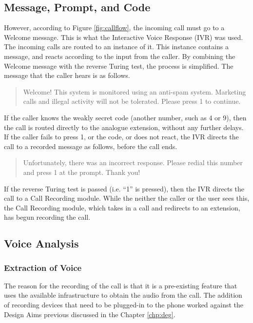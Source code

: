 \documentclass[main.tex]{subfiles}
\begin{document}
\subsection{Message, Prompt, and Code}
However, according to Figure \ref{fig:callflow}, the incoming call must go to a Welcome message. This is what the Interactive Voice Response (IVR) was used. The incoming calls are routed to an instance of it. This instance contains a message, and reacts according to the input from the caller. By combining the Welcome message with the reverse Turing test, the process is simplified. The message that the caller hears is as follows.

\begin{quote}
	Welcome! This system is monitored using an anti-spam system. Marketing calls and illegal activity will not be tolerated. Please press 1 to continue.
\end{quote}

If the caller knows the weakly secret code (another number, such as 4 or 9), then the call is routed directly to the analogue extension, without any further delays. If the caller fails to press 1, or the code, or does not react, the IVR directs the call to a recorded message as follows, before the call ends.

\begin{quote}
	Unfortunately, there was an incorrect response. Please redial this number and press 1 at the prompt. Thank you!
\end{quote}

If the reverse Turing test is passed (i.e. ``1'' is pressed), then the IVR directs the call to a Call Recording module. While the neither the caller or the user sees this, the Call Recording module, which takes in a call and redirects to an extension, has begun recording the call.

\subsection{Voice Analysis}
\subsubsection{Extraction of Voice}
The reason for the recording of the call is that it is a pre-existing feature that uses the available infrastructure to obtain the audio from the call. The addition of recording devices that need to be plugged-in to the phone worked against the Design Aims previous discussed in the Chapter \ref{chp:deg}.
\end{document}
